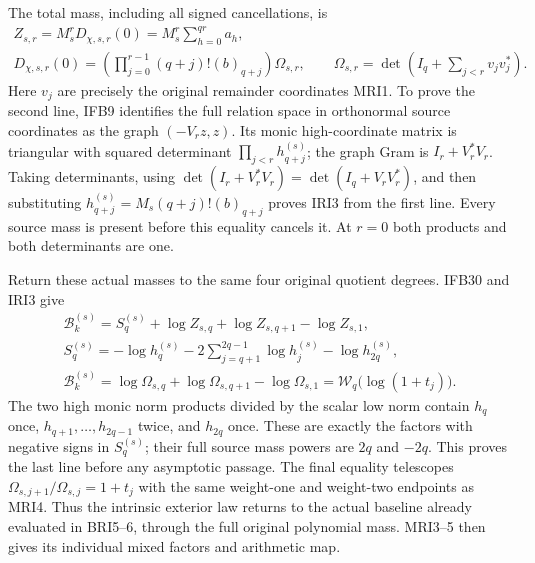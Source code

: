\documentclass[11pt,a4paper]{article}
\begin{document}
The total mass, including all signed cancellations, is
\[
\begin{gathered}
 Z_{s,r}=M_s^rD_{\chi,s,r}(0)
        =M_s^r\sum_{h=0}^{qr}a_h,\\
 D_{\chi,s,r}(0)
   =\left(\prod_{j=0}^{r-1}(q+j)!(b)_{q+j}\right)\Omega_{s,r},
 \qquad
 \Omega_{s,r}=\det\left(I_q+\sum_{j<r}v_jv_j^*\right).
\end{gathered}\tag{IRI3}
\]
Here $v_j$ are precisely the original remainder coordinates MRI1.
To prove the second line, IFB9 identifies the full relation space
in orthonormal source coordinates as the graph $(-V_rz,z)$.
Its monic high-coordinate matrix is triangular with squared
determinant $\prod_{j<r}h_{q+j}^{(s)}$; the graph Gram is
$I_r+V_r^*V_r$. Taking determinants, using
$\det(I_r+V_r^*V_r)=\det(I_q+V_rV_r^*)$, and then substituting
$h_{q+j}^{(s)}=M_s(q+j)!(b)_{q+j}$ proves IRI3 from the first
line. Every source mass is present before this equality cancels it.
At $r=0$ both products and both determinants are one.

Return these actual masses to the same four original quotient
degrees. IFB30 and IRI3 give
\[
\begin{gathered}
 \mathcal B_k^{(s)}
   =S_q^{(s)}+\log Z_{s,q}+\log Z_{s,q+1}-\log Z_{s,1},\\
 S_q^{(s)}=-\log h_q^{(s)}
       -2\sum_{j=q+1}^{2q-1}\log h_j^{(s)}-\log h_{2q}^{(s)},\\
 \mathcal B_k^{(s)}
   =\log\Omega_{s,q}+\log\Omega_{s,q+1}-\log\Omega_{s,1}
   =\mathcal W_q\bigl(\log(1+t_j)\bigr).
\end{gathered}\tag{IRI4}
\]
The two high monic norm products divided by the scalar low norm
contain $h_q$ once, $h_{q+1},\ldots,h_{2q-1}$ twice, and
$h_{2q}$ once. These are exactly the factors with negative signs
in $S_q^{(s)}$; their full source mass powers are $2q$ and $-2q$.
This proves the last line before any asymptotic passage. The final
equality telescopes $\Omega_{s,j+1}/\Omega_{s,j}=1+t_j$ with
the same weight-one and weight-two endpoints as MRI4. Thus the
intrinsic exterior law returns to the actual baseline already
evaluated in BRI5--6, through the full original polynomial mass.
MRI3--5 then gives its individual mixed factors and arithmetic map.
\end{document}
